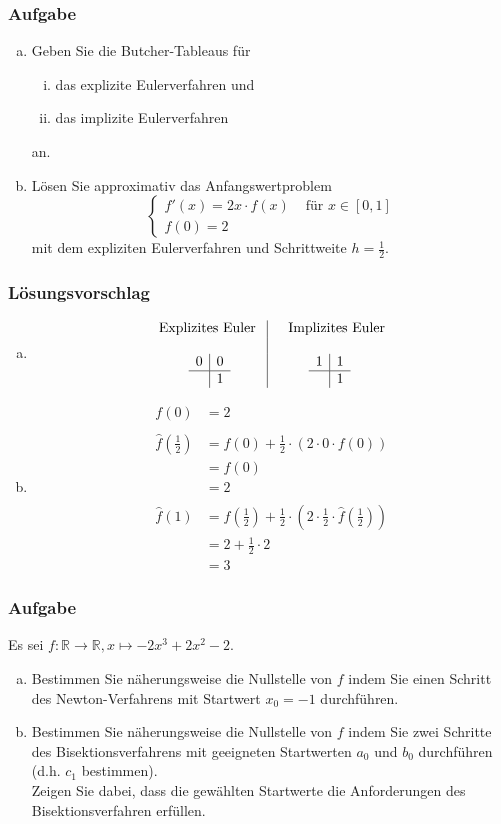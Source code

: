 \documentclass[a4paper,11pt]{scrartcl}
\newcounter{auf}
\newcommand{\Aufgabe}%
        {\addtocounter{auf}{1} \subsubsection*{\rmfamily  Aufgabe \theauf \hspace{1em}} }
\newcommand{\RR}{\mathbb{R}}
\begin{document}
\newpage
\Aufgabe
\begin{enumerate}[a)]
\item
Geben Sie die Butcher-Tableaus für 
\begin{enumerate}[(i)]
\item das explizite Eulerverfahren und 
\item das implizite Eulerverfahren
\end{enumerate}
an.
\item
Lösen Sie approximativ das Anfangswertproblem
$$
\begin{cases} f'(x)=2x\cdot f(x) & \text{ für } x \in [0,1] \\
f(0)=2
\end{cases}
$$
mit dem expliziten Eulerverfahren und Schrittweite $h=\frac{1}{2}$.
\end{enumerate}
%
\subsubsection*{Lösungsvorschlag}
\begin{enumerate}[a)]
\item 
$$
\begin{array}{c|c}
\text{Explizites Euler  } &\quad \text{Implizites Euler}\\
&\\
\begin{array}{c|c}
0&0\\\hline
&1
\end{array}&
\begin{array}{c|c}
1&1\\\hline
&1
\end{array}
\end{array}
$$
\item 
\begin{align*}
f(0)&=2\\
&\\
\hat f(\frac{1}{2})&=f(0)+\frac{1}{2}\cdot (2\cdot 0 \cdot f(0))\\
&=f(0)\\
&=2\\
&\\
\hat f(1)&=f(\frac{1}{2})+\frac{1}{2} \cdot (2 \cdot \frac{1}{2} \cdot \hat f(\frac{1}{2}))\\
&=2+\frac{1}{2}\cdot 2\\
&=3
\end{align*}
\end{enumerate}


\newpage
\Aufgabe
Es sei $f: \RR \to \RR, x \mapsto -2x^3+2x^2-2$.
\begin{enumerate}[a)]
\item Bestimmen Sie näherungsweise die Nullstelle von $f$
indem Sie einen Schritt des Newton-Verfahrens mit Startwert $x_0=-1$ durchführen.
\item Bestimmen Sie näherungsweise die Nullstelle von $f$
indem Sie zwei Schritte des Bisektionsverfahrens mit geeigneten Startwerten $a_0$ und $b_0$ durchführen (d.h. $c_1$ bestimmen).\\
Zeigen Sie dabei, dass die gewählten Startwerte die Anforderungen des Bisektionsverfahren erfüllen.
\end{enumerate}
%
%
\end{document}
